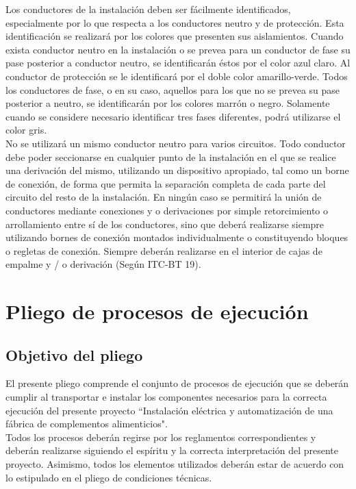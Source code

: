 Los conductores de la instalación deben ser fácilmente identificados, especialmente por lo que respecta a los conductores neutro y de protección. Esta identificación se realizará por los colores que presenten sus aislamientos. Cuando exista conductor neutro en la instalación o se prevea para un conductor de fase su pase posterior a conductor neutro, se identificarán éstos por el color azul claro. Al conductor de protección se le identificará por el doble color amarillo-verde. Todos los conductores de fase, o en su caso, aquellos para los que no se prevea su pase posterior a neutro, se identificarán por los colores marrón o negro. Solamente cuando se considere necesario identificar tres fases diferentes, podrá utilizarse el color gris.\\

No se utilizará un mismo conductor neutro para varios circuitos. Todo conductor debe poder seccionarse en cualquier punto de la instalación en el que se realice una derivación del mismo, utilizando un dispositivo apropiado, tal como un borne de conexión, de forma que permita la separación completa de cada parte del circuito del resto de la instalación. En ningún caso se permitirá la unión de conductores mediante conexiones y o derivaciones por simple retorcimiento o arrollamiento entre sí de los conductores, sino que deberá realizarse siempre utilizando bornes de conexión montados individualmente o constituyendo bloques o regletas de conexión. Siempre deberán realizarse en el interior de cajas de empalme y / o derivación (Según ITC-BT 19).\\

\newpage

\section {Pliego de procesos de ejecución}

\subsection{Objetivo del pliego}	
El presente pliego comprende el conjunto de procesos de ejecución que se deberán cumplir al transportar e instalar los componentes necesarios para la correcta ejecución del presente proyecto ``Instalación eléctrica y automatización de una fábrica de complementos alimenticios".
\\
Todos los procesos deberán regirse por los reglamentos correspondientes y deberán realizarse siguiendo el espíritu y la correcta interpretación del presente proyecto. Asimismo, todos los elementos utilizados deberán estar de acuerdo con lo estipulado en el pliego de condiciones técnicas.

